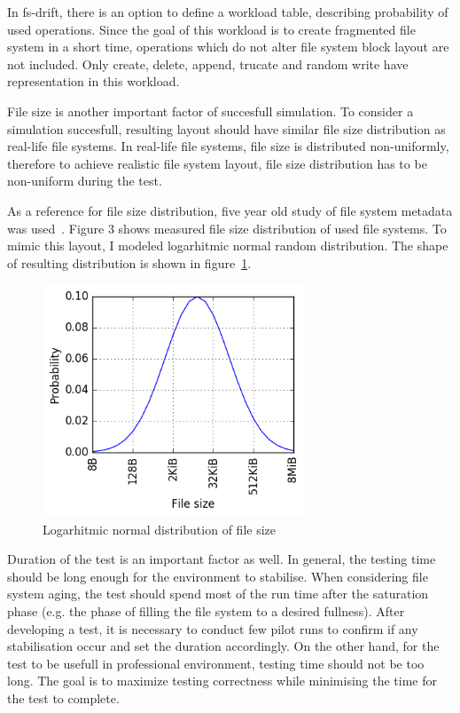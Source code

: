 \documentclass[
  color, %
  table, %
  lof,   %
  lot,   %
]{fithesis3}
\begin{document}
In fs-drift, there is an option to define a workload table, describing probability of used operations. Since the goal of this workload is to create fragmented file system in a short time, operations which do not alter file system block layout are not included. Only create, delete, append, trucate and random write have representation in this workload. 

File size is another important factor of succesfull simulation. To consider a simulation succesfull, resulting layout should have similar file size distribution as real-life file systems. In real-life file systems, file size is distributed non-uniformly, therefore to achieve realistic file system layout, file size distribution has to be non-uniform during the test.

As a reference for file size distribution, five year old study of file system metadata was used~\cite{agrawal2007five}. Figure 3 shows measured file size distribution of used file systems. To mimic this layout, I modeled logarhitmic normal random distribution. The shape of resulting distribution is shown in figure~\ref{fig:lognormal}.

\begin{figure}[!htb]
    \begin{minipage}{\textwidth}
        \centering
        \includegraphics[width=0.7\textwidth]{../scripts/dist3.png}
        \caption{Logarhitmic normal distribution of file size}
\label{fig:lognormal}
    \end{minipage}
\end{figure}

Duration of the test is an important factor as well. In general, the testing time should be long enough for the environment to stabilise. When considering file system aging, the test should spend most of the run time after the saturation phase (e.g. the phase of filling the file system to a desired fullness). After developing a test, it is necessary to conduct few pilot runs to confirm if any stabilisation occur and set the duration accordingly. On the other hand, for the test to be usefull in professional environment, testing time should not be too long. The goal is to maximize testing correctness while minimising the time for the test to complete.
\end{document}
